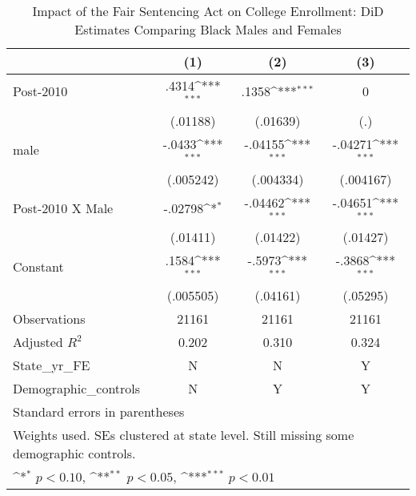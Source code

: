 \begin{table}[htbp]\centering
\def\sym#1{\ifmmode^{#1}\else\(^{#1}\)\fi}
\caption{Impact of the Fair Sentencing Act on College Enrollment: DiD Estimates Comparing Black Males and Females}
\begin{tabular}{l*{3}{c}}
\hline\hline
                    &\multicolumn{1}{c}{(1)}         &\multicolumn{1}{c}{(2)}         &\multicolumn{1}{c}{(3)}         \\
\hline
Post-2010           &       .4314\sym{***}&       .1358\sym{***}&           0         \\
                    &    (.01188)         &    (.01639)         &         (.)         \\
[1em]
male                &      -.0433\sym{***}&     -.04155\sym{***}&     -.04271\sym{***}\\
                    &   (.005242)         &   (.004334)         &   (.004167)         \\
[1em]
Post-2010 X Male    &     -.02798\sym{*}  &     -.04462\sym{***}&     -.04651\sym{***}\\
                    &    (.01411)         &    (.01422)         &    (.01427)         \\
[1em]
Constant            &       .1584\sym{***}&      -.5973\sym{***}&      -.3868\sym{***}\\
                    &   (.005505)         &    (.04161)         &    (.05295)         \\
\hline
Observations        &       21161         &       21161         &       21161         \\
Adjusted \(R^{2}\)  &       0.202         &       0.310         &       0.324         \\
State\_yr\_FE         &           N         &           N         &           Y         \\
Demographic\_controls&           N         &           Y         &           Y         \\
\hline\hline
\multicolumn{4}{l}{\footnotesize Standard errors in parentheses}\\
\multicolumn{4}{l}{\footnotesize Weights used. SEs clustered at state level. Still missing some demographic controls.}\\
\multicolumn{4}{l}{\footnotesize \sym{*} \(p<0.10\), \sym{**} \(p<0.05\), \sym{***} \(p<0.01\)}\\
\end{tabular}
\end{table}
